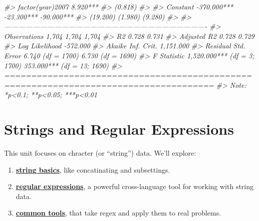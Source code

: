 \documentclass[]{book}
\newenvironment{Shaded}{\begin{snugshade}}{\end{snugshade}}
\newcommand{\CommentTok}[1]{\textcolor[rgb]{0.56,0.35,0.01}{\textit{#1}}}
\providecommand{\tightlist}{%
  \setlength{\itemsep}{0pt}\setlength{\parskip}{0pt}}
\begin{document}
\begin{Shaded}
\begin{Highlighting}[]
\CommentTok{#> factor(year)2007                                         8.920***                    }
\CommentTok{#>                                                          (0.818)                     }
\CommentTok{#>                                                                                      }
\CommentTok{#> Constant                    -370.000***                 -23.300***         -90.000***}
\CommentTok{#>                              (19.200)                    (1.980)            (9.280)  }
\CommentTok{#>                                                                                      }
\CommentTok{#> -------------------------------------------------------------------------------------}
\CommentTok{#> Observations                   1,704                      1,704              1,704   }
\CommentTok{#> R2                             0.728                      0.731                      }
\CommentTok{#> Adjusted R2                    0.728                      0.729                      }
\CommentTok{#> Log Likelihood                                                              -572.000 }
\CommentTok{#> Akaike Inf. Crit.                                                          1,151.000 }
\CommentTok{#> Residual Std. Error      6.740 (df = 1700)          6.730 (df = 1690)                }
\CommentTok{#> F Statistic         1,520.000*** (df = 3; 1700) 353.000*** (df = 13; 1690)           }
\CommentTok{#> =====================================================================================}
\CommentTok{#> Note:                                                     *p<0.1; **p<0.05; ***p<0.01}
\end{Highlighting}
\end{Shaded}

\hypertarget{strings-and-regular-expressions}{%
\chapter{Strings and Regular Expressions}\label{strings-and-regular-expressions}}

This unit focuses on chracter (or ``string'') data. We'll explore:

\begin{enumerate}
\def\labelenumi{\arabic{enumi}.}
\tightlist
\item
  \textbf{\protect\hyperlink{string-basics}{string basics}}, like concatinating and subsettings.
\item
  \textbf{\protect\hyperlink{regular-expressions}{regular expressions}}, a powerful cross-language tool for working with string data.
\item
  \textbf{\protect\hyperlink{common-tools}{common tools}}, that take regex and apply them to real problems.
\end{enumerate}
\end{document}

